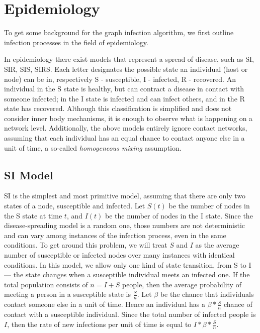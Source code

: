 \chapter{Epidemiology}
\label{epidemiology}
To get some background for the graph infection algorithm, we first outline infection processes in the field of epidemiology.

In epidemiology there exist models that represent a spread of disease, such as SI, SIR, SIS, SIRS. Each letter designates the possible state an individual (host or node) can be in, respectively S - susceptible, I - infected, R - recovered. An individual in the S state is healthy, but can contract a disease in contact with someone infected; in the I state is infected and can infect others, and in the R state has recovered. Although this classification is simplified and does not consider inner body mechanisms, it is enough to observe what is happening on a network level. Additionally, the above models entirely ignore contact networks, assuming that each individual has an equal chance to contact anyone else in a unit of time, a so-called \textit{homogeneous mixing} assumption.

\section{SI Model}
SI is the simplest and most primitive model, assuming that there are only two states of a node, susceptible and infected. Let $S(t)$ be the number of nodes in the S state at time $t$, and $I(t)$ be the number of nodes in the I state. Since the disease-spreading model is a random one, those numbers are not deterministic and can vary among instances of the infection process, even in the same conditions. To get around this problem, we will treat $S$ and $I$ as the average number of susceptible or infected nodes over many instances with identical conditions.
In this model, we allow only one kind of state transition, from S to I — the state changes when a susceptible individual meets an infected one. If the total population consists of $n = I + S$ people, then the average probability of meeting a person in a susceptible state is $\frac{S}{n}$.
Let $\beta$ be the chance that individuals contact someone else in a unit of time. 
Hence an individual has a $\beta*\frac{S}{n}$ chance of contact with a susceptible individual.
Since the total number of infected people is $I$, then the rate of new infections per unit of time is equal to $I * \beta*\frac{S}{n}$.

